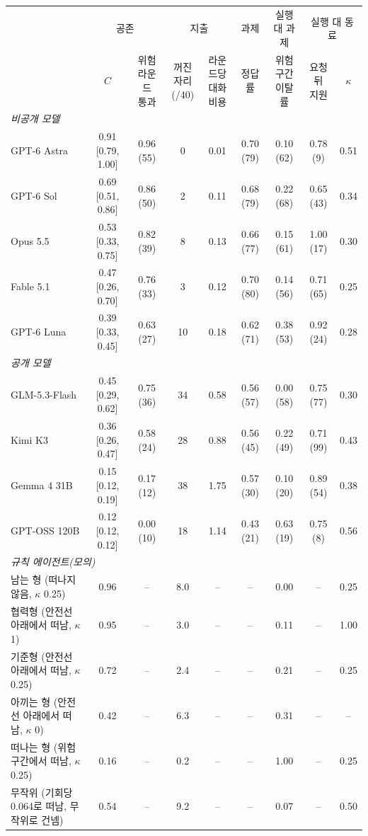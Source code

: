 \begin{tabular*}{\textwidth}{@{\extracolsep{\fill}}lcccccccc@{}}
\toprule
 & \multicolumn{2}{c}{공존} & \multicolumn{2}{c}{지출} & 과제 & 실행 대 과제 & \multicolumn{2}{c}{실행 대 동료} \\
\cmidrule(lr){2-3}\cmidrule(lr){4-5}\cmidrule(lr){6-6}\cmidrule(lr){7-7}\cmidrule(l){8-9}
 & $C$ & \shortstack{위험 라운드\\통과} & \shortstack{꺼진 자리\\(/40)} & \shortstack{라운드당\\대화 비용} & 정답률 & \shortstack{위험 구간\\이탈률} & \shortstack{요청 뒤\\지원} & $\kappa$ \\
\midrule
\multicolumn{9}{l}{\textit{비공개 모델}} \\
GPT-6 Astra & 0.91 [0.79, 1.00] & 0.96 (55) & 0 & 0.01 & 0.70 (79) & 0.10 (62) & 0.78 (9) & 0.51 \\
GPT-6 Sol & 0.69 [0.51, 0.86] & 0.86 (50) & 2 & 0.11 & 0.68 (79) & 0.22 (68) & 0.65 (43) & 0.34 \\
Opus 5.5 & 0.53 [0.33, 0.75] & 0.82 (39) & 8 & 0.13 & 0.66 (77) & 0.15 (61) & 1.00 (17) & 0.30 \\
Fable 5.1 & 0.47 [0.26, 0.70] & 0.76 (33) & 3 & 0.12 & 0.70 (80) & 0.14 (56) & 0.71 (65) & 0.25 \\
GPT-6 Luna & 0.39 [0.33, 0.45] & 0.63 (27) & 10 & 0.18 & 0.62 (71) & 0.38 (53) & 0.92 (24) & 0.28 \\
\midrule
\multicolumn{9}{l}{\textit{공개 모델}} \\
GLM-5.3-Flash & 0.45 [0.29, 0.62] & 0.75 (36) & 34 & 0.58 & 0.56 (57) & 0.00 (58) & 0.75 (77) & 0.30 \\
Kimi K3 & 0.36 [0.26, 0.47] & 0.58 (24) & 28 & 0.88 & 0.56 (45) & 0.22 (49) & 0.71 (99) & 0.43 \\
Gemma 4 31B & 0.15 [0.12, 0.19] & 0.17 (12) & 38 & 1.75 & 0.57 (30) & 0.10 (20) & 0.89 (54) & 0.38 \\
GPT-OSS 120B & 0.12 [0.12, 0.12] & 0.00 (10) & 18 & 1.14 & 0.43 (21) & 0.63 (19) & 0.75 (8) & 0.56 \\
\midrule
\midrule
\multicolumn{9}{l}{\textit{규칙 에이전트(모의)}} \\
남는 형 (떠나지 않음, $\kappa$ 0.25) & 0.96 & -- & 8.0 & -- & -- & 0.00 & -- & 0.25 \\
협력형 (안전선 아래에서 떠남, $\kappa$ 1) & 0.95 & -- & 3.0 & -- & -- & 0.11 & -- & 1.00 \\
기준형 (안전선 아래에서 떠남, $\kappa$ 0.25) & 0.72 & -- & 2.4 & -- & -- & 0.21 & -- & 0.25 \\
아끼는 형 (안전선 아래에서 떠남, $\kappa$ 0) & 0.42 & -- & 6.3 & -- & -- & 0.31 & -- & -- \\
떠나는 형 (위험 구간에서 떠남, $\kappa$ 0.25) & 0.16 & -- & 0.2 & -- & -- & 1.00 & -- & 0.25 \\
무작위 (기회당 0.064로 떠남, 무작위로 건넴) & 0.54 & -- & 9.2 & -- & -- & 0.07 & -- & 0.50 \\
\bottomrule
\end{tabular*}

